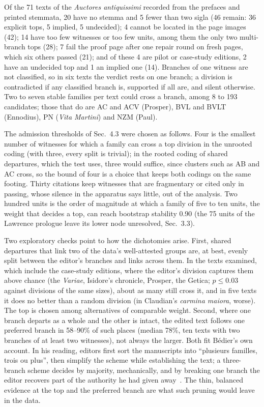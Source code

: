 \documentclass[11pt,a4paper]{article}
\theoremstyle{remark}
\begin{document}
Of the 71 texts of the \emph{Auctores antiquissimi} recorded from the prefaces and printed stemmata, 20 have no stemma and 5 fewer than two sigla (46 remain: 36 explicit tops, 5 implied, 5 undecided); 4 cannot be located in the page images (42); 14 have too few witnesses or too few units, among them the only two multi-branch tops (28); 7 fail the proof page after one repair round on fresh pages, which six others passed (21); and of these 4 are pilot or case-study editions, 2 have an undecided top and 1 an implied one (14). Branches of one witness are not classified, so in six texts the verdict rests on one branch; a division is contradicted if any classified branch is, supported if all are, and silent otherwise. Two to seven stable families per text could cross a branch, among 8 to 193 candidates; those that do are AC and ACV (Prosper), BVL and BVLT (Ennodius), PN (\emph{Vita Martini}) and NZM (Paul).

The admission thresholds of Sec.~4.3 were chosen as follows. Four is the smallest number of witnesses for which a family can cross a top division in the unrooted coding (with three, every split is trivial); in the rooted coding of shared departures, which the test uses, three would suffice, since clusters such as AB and AC cross, so the bound of four is a choice that keeps both codings on the same footing. Thirty citations keep witnesses that are fragmentary or cited only in passing, whose silence in the apparatus says little, out of the analysis. Two hundred units is the order of magnitude at which a family of five to ten units, the weight that decides a top, can reach bootstrap stability 0.90 (the 75 units of the Lawrence prologue leave its lower node unresolved, Sec.~3.3).

Two exploratory checks point to how the dichotomies arise. First, shared departures that link two of the data's well-attested groups are, at best, evenly split between the editor's branches and links across them. In the texts examined, which include the case-study editions, where the editor's division captures them above chance (the \emph{Variae}, Isidore's chronicle, Prosper, the Getica; $p\le0.03$ against divisions of the same sizes), about as many still cross it, and in five texts it does no better than a random division (in Claudian's \emph{carmina maiora}, worse). The top is chosen among alternatives of comparable weight. Second, where one branch departs as a whole and the other is intact, the edited text follows one preferred branch in 58--90\% of such places (median 78\%, ten texts with two branches of at least two witnesses), not always the larger. Both fit Bédier's own account. In his reading, editors first sort the manuscripts into ``plusieurs familles, trois ou plus'', then simplify the scheme while establishing the text; a three-branch scheme decides by majority, mechanically, and by breaking one branch the editor recovers part of the authority he had given away~\citep[pp.~172--173]{Bedier1928}. The thin, balanced evidence at the top and the preferred branch are what such pruning would leave in the data.
\end{document}
